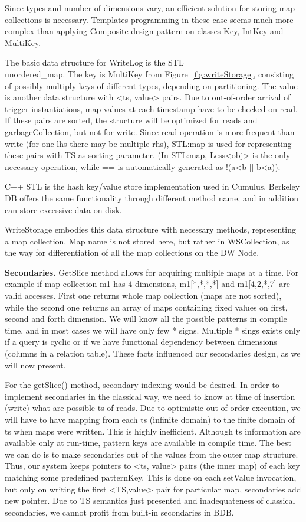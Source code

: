\documentclass{sig-semester}
\begin{document}
Since types and number of dimensions vary, an efficient solution for storing map collections is necessary. Templates programming in these case seems much more complex than applying Composite design pattern on classes Key, IntKey and MultiKey.

The basic data structure for WriteLog is the STL \\ unordered\_map. The key is MultiKey from Figure~\ref{fig:writeStorage}, consisting of possibly multiply keys of different types, depending on partitioning. The value is another data structure with <ts, value> pairs. Due to out-of-order arrival of trigger instantiations, map values at each timestamp have to be checked on read. If these pairs are sorted, the structure will be optimized for reads and garbageCollection, but not for write. Since read operation is more frequent than write (for one lhs there may be multiple rhs), STL:map is used for representing these pairs with TS as sorting parameter. (In STL:map, Less<obj> is the only necessary operation, while == is automatically generated as !(a<b || b<a)).

C++ STL is the hash key/value store implementation used in Cumulus. Berkeley DB offers the same functionality through different method name, and in addition can store excessive data on disk.

WriteStorage embodies this data structure with necessary methods, representing a map collection. Map name is not stored here, but rather in WSCollection, as the way for differentiation of all the map collections on the DW Node.

\textbf{Secondaries.} GetSlice method allows for acquiring multiple maps at a time. For example if map collection m1 has 4 dimensions, m1[*,*,*,*] and m1[4,2,*,7] are valid accesses. First one returns whole map collection (maps are not sorted), while the second one returns an array of maps containing fixed values on first, second and forth dimension. We will know all the possible patterns in compile time, and in most cases we will have only few * signs. Multiple * sings exists only if a query is cyclic or if we have functional dependency between dimensions (columns in a relation table). These facts influenced our secondaries design, as we will now present.

For the getSlice() method, secondary indexing would be desired. In order to implement secondaries in the classical way, we need to know at time of insertion (write) what are possible ts of reads. Due to optimistic out-of-order execution, we will have to have mapping from each ts (infinite domain) to the finite domain of ts when maps were written. This is highly inefficient. Although ts information are available only at run-time, pattern keys are available in compile time. The best we can do is to make secondaries out of the values from the outer map structure. Thus, our system keeps pointers to <ts, value> pairs (the inner map) of each key matching some predefined patternKey. This is done on each setValue invocation, but only on writing the first <TS,value> pair for particular map, secondaries add new pointer. Due to TS semantics just presented and inadequateness of classical secondaries, we cannot profit from built-in secondaries in BDB.
\end{document}

